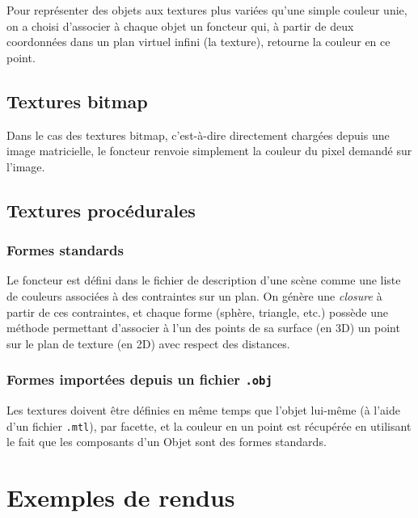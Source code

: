 \documentclass{article}
\begin{document}
Pour représenter des objets aux textures plus variées qu'une simple couleur
unie, on a choisi d'associer à chaque objet un foncteur qui, à partir de deux
coordonnées dans un plan virtuel infini (la texture), retourne la couleur en
ce point.

\subsection{Textures bitmap}

Dans le cas des textures bitmap, c'est-à-dire directement chargées depuis une
image matricielle, le foncteur renvoie simplement la couleur du pixel demandé
sur l'image.

\subsection{Textures procédurales}

\subsubsection{Formes standards}

Le foncteur est défini dans le fichier de description d'une scène comme une
liste de couleurs associées à des contraintes sur un plan. On génère une
\emph{closure} à partir de ces contraintes, et chaque forme (sphère, triangle,
etc.) possède une méthode permettant d'associer à l'un des points de sa
surface (en 3D) un point sur le plan de texture (en 2D) avec respect des
distances.

\subsubsection{Formes importées depuis un fichier \texttt{.obj}}

Les textures doivent être définies en même temps que l'objet lui-même (à
l'aide d'un fichier \texttt{.mtl}), par facette, et la couleur en un point est
récupérée en utilisant le fait que les composants d'un Objet sont des formes
standards.

\section{Exemples de rendus}
\end{document}
